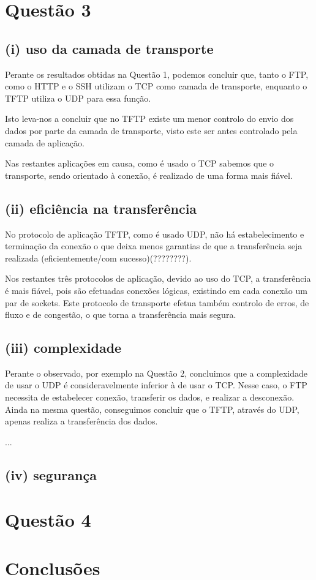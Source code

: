 \documentclass{llncs}
\begin{document}
\section{Questão 3}
\subsection{(i) uso da camada de transporte}
Perante os resultados obtidas na Questão 1, podemos concluir que, tanto o FTP, como o HTTP e o SSH utilizam o TCP como camada de transporte, enquanto o TFTP utiliza o UDP para essa função.

Isto leva-nos a concluir que no TFTP existe um menor controlo do envio dos dados por parte da camada de transporte, visto este ser antes controlado pela camada de aplicação.

Nas restantes aplicações em causa, como é usado o TCP sabemos que o transporte, sendo orientado à conexão, é realizado de uma forma mais fiável.

\subsection{(ii) eficiência na transferência}
No protocolo de aplicação TFTP, como é usado UDP, não há estabelecimento e terminação da conexão o que deixa menos garantias de que a transferência seja realizada (eficientemente/com sucesso)(????????).

Nos restantes três protocolos de aplicação, devido ao uso do TCP, a transferência é mais fiável, pois são efetuadas conexões lógicas, existindo em cada conexão um par de sockets. Este protocolo de transporte efetua também controlo de erros, de fluxo e de congestão, o que torna a transferência mais segura.

\subsection{(iii) complexidade}
Perante o observado, por exemplo na Questão 2, concluimos que a complexidade de usar o UDP é consideravelmente inferior à de usar o TCP. Nesse caso, o FTP necessita de estabelecer conexão, transferir os dados, e realizar a desconexão. Ainda na mesma questão, conseguimos concluir que o TFTP, através do UDP, apenas realiza a transferência dos dados.

...

\subsection{(iv) segurança}


\section{Questão 4}

\section{Conclusões}
\end{document}
